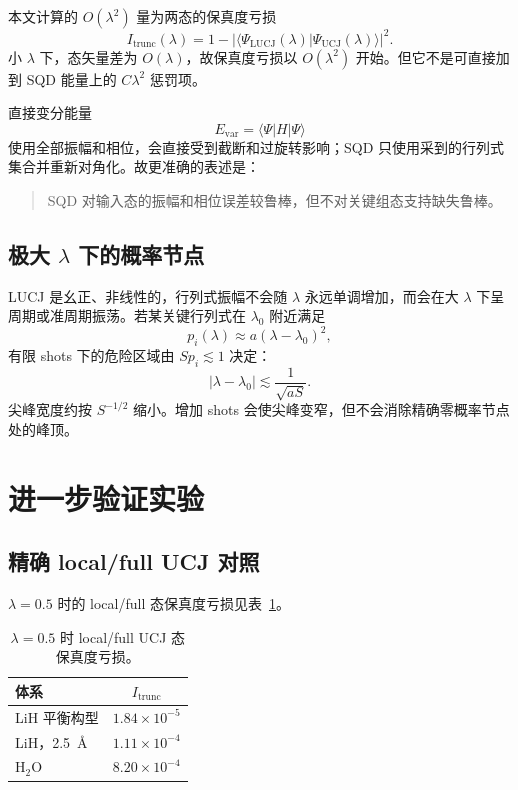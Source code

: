 \documentclass[UTF8,12pt,a4paper]{ctexart}
\begin{document}
本文计算的 $O(\lambda^2)$ 量为两态的保真度亏损
\begin{equation}
I_{\mathrm{trunc}}(\lambda)
=1-\left|
\langle\Psi_{\mathrm{LUCJ}}(\lambda)|
\Psi_{\mathrm{UCJ}}(\lambda)\rangle
\right|^2.
\label{eq:infidelity}
\end{equation}
小 $\lambda$ 下，态矢量差为 $O(\lambda)$，故保真度亏损以 $O(\lambda^2)$ 开始。但它不是可直接加到 SQD 能量上的 $C\lambda^2$ 惩罚项。

直接变分能量
\begin{equation}
E_{\mathrm{var}}=\langle\Psi|H|\Psi\rangle
\end{equation}
使用全部振幅和相位，会直接受到截断和过旋转影响；SQD 只使用采到的行列式集合并重新对角化。故更准确的表述是：

\begin{quote}
SQD 对输入态的振幅和相位误差较鲁棒，但不对关键组态支持缺失鲁棒。
\end{quote}

\subsection{\texorpdfstring{极大 $\lambda$ 下的概率节点}{极大 lambda 下的概率节点}}

LUCJ 是幺正、非线性的，行列式振幅不会随 $\lambda$ 永远单调增加，而会在大 $\lambda$ 下呈周期或准周期振荡。若某关键行列式在 $\lambda_0$ 附近满足
\begin{equation}
p_i(\lambda)
\approx a(\lambda-\lambda_0)^2,
\end{equation}
有限 shots 下的危险区域由 $S p_i\lesssim1$ 决定：
\begin{equation}
|\lambda-\lambda_0|
\lesssim\frac{1}{\sqrt{aS}}.
\label{eq:width}
\end{equation}
尖峰宽度约按 $S^{-1/2}$ 缩小。增加 shots 会使尖峰变窄，但不会消除精确零概率节点处的峰顶。

\section{进一步验证实验}

\subsection{精确 local/full UCJ 对照}

$\lambda=0.5$ 时的 local/full 态保真度亏损见表~\ref{tab:infidelity}。

\begin{table}[H]
\centering
\caption{$\lambda=0.5$ 时 local/full UCJ 态保真度亏损。}
\label{tab:infidelity}
\begin{tabular}{lc}
\toprule
体系 & $I_{\mathrm{trunc}}$ \\
\midrule
LiH 平衡构型 & $1.84\times10^{-5}$ \\
LiH，2.5~\AA & $1.11\times10^{-4}$ \\
H$_2$O & $8.20\times10^{-4}$ \\
\bottomrule
\end{tabular}
\end{table}
\end{document}
